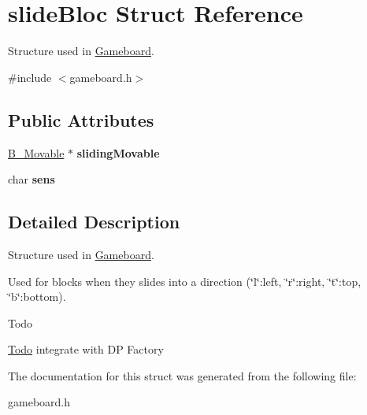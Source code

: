 \hypertarget{structslide_bloc}{}\section{slide\+Bloc Struct Reference}
\label{structslide_bloc}


Structure used in \hyperlink{class_gameboard}{Gameboard}.  




{\ttfamily \#include $<$gameboard.\+h$>$}

\subsection*{Public Attributes}
\begin{DoxyCompactItemize}
\item 
\hypertarget{structslide_bloc_a6fc7a4aca79032561e6d86f04b408695}{}\hyperlink{class_b___movable}{B\+\_\+\+Movable} $\ast$ {\bfseries sliding\+Movable}\label{structslide_bloc_a6fc7a4aca79032561e6d86f04b408695}

\item 
\hypertarget{structslide_bloc_adddf09c54543b518c768c0499f2db8b3}{}char {\bfseries sens}\label{structslide_bloc_adddf09c54543b518c768c0499f2db8b3}

\end{DoxyCompactItemize}


\subsection{Detailed Description}
Structure used in \hyperlink{class_gameboard}{Gameboard}. 

Used for blocks when they slides into a direction (\char`\"{}l\char`\"{}\+:left, \char`\"{}r\char`\"{}\+:right, \char`\"{}t\char`\"{}\+:top, \char`\"{}b\char`\"{}\+:bottom). \begin{DoxyRefDesc}{Todo}
\item[\hyperlink{todo__todo000007}{Todo}]integrate with D\+P Factory \end{DoxyRefDesc}


The documentation for this struct was generated from the following file\+:\begin{DoxyCompactItemize}
\item 
gameboard.\+h\end{DoxyCompactItemize}
